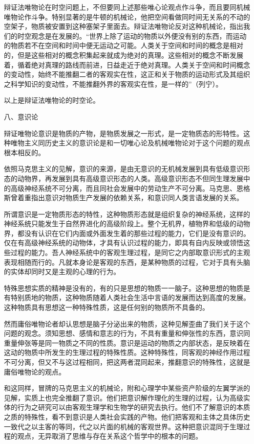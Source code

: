 辩证法唯物论在时空问题上，不但要同上述那些唯心论观点作斗争，而且要同机械唯物论作斗争。特别显著的是牛顿的机械论，他把空间看做同时间无关系的不动的空架子，物质被安置到这种塞架子里面去。辩证法唯物论反对这种机械论，指出我们的时空观念是在发展的。“世界上除了运动的物质以外便没有别的东西，而运动的物质若不在空间和时间中便无运动之可能。人类关于空间和时间的概念是相对的，但是这些相对的概念积集起来就成为绝对的真理。这些相对的概念不断发展着，循着绝对真理的路线而前进，日益走近于绝对真理。人类关于空间和时间概念的变动性，始终不能推翻二者的客观实在性，这正和关于物质的运动形式及其组织之科学知识的变动性，不能推翻外界的客观实在性，是一样的”（列宁）。

以上是辩证法唯物论的时空论。

八、意识论

辩证唯物论意识是物质的产物，是物质发展之一形式，是一定物质态的形特性。这种唯物主义同历史主义的意识论是和一切唯心论及机械唯物论对于这个问题的观点根本相反的。

依照马克思主义的见解，意识的来源，是由无意识的无机械发展到具有低级意识形态的动物界，再发展到具有高级意识形态的人类。高级意识形态不但同生理发展中的高级神经系统不可分离，而且同社会发展中的劳动生产不可分离。马克思、恩格斯曾着重指出意识对物质生产发展的依赖关系，和意识同人类言语发展的关系。

所谓意识是一定物质形态的特性，这种物质形态就是组织复杂的神经系统，这样的神经系统只能发生于自然界进化的高级阶段上。整个无机界，植物界和低级的动物界，都没有认识在它们内面或外面发生着的那些过程的能力，它们是没有意识的。仅在有高级神经系统的动物体，才具有认识过程的能力，即具有自内反映或领悟这些过程的能力。吾人神经系统中的客观生理过程，是同它之内部取意识形式的主观表现相随而行的。凡就本身论是客观的东西，是某种物质的过程，它对于具有头脑的实体却同时又是主观的心理的行为。

特殊思想实质的精神是没有的，有的只是思想的物质一一脑子。这种思想的物质是有特别质地的物质，这种物质随着人类社会生活中言语的发展而达到高度的发展。这种物质具有思想这一种特殊性质，这是任何别的物质所不具备的。

然而庸俗唯物论者却认思想是脑子分泌出来的物质，这种见解歪曲了我们关于这个问题的观念。须知思想、感情和意志的行为，不具有重量和伸张性的东西，意识同重量伸张等是同一物质之不同的性质。意识是运动的物质之内部状态，是反映着在这动的物质中所发生的生理过程的特殊性质。这种特殊性，同客观的神经作用过程不可分离，但又不与这过程相同，把这两者混同起来，推翻意识的特殊性，这就是庸俗唯物论的观点。

和这同样，冒牌的马克思主义的机械论，附和心理学中某些资产阶级的左翼学派的见解，实质上也完全推翻了意识。他们把意识解作理化的生理的过程，认为高级实体的行为之研究可以由客观生理学和生物学的研究去执行。他们不了解意识的本质之质的特殊性，看不到意识是人类社会实践的产物。他们把客观和主体之具体历史一致代之以主客的等同，代之以片面的机械的客观世界。这种把意识混同于生理过程的观点，无异取消了思维与存在关系这个哲学中的根本的问题。

